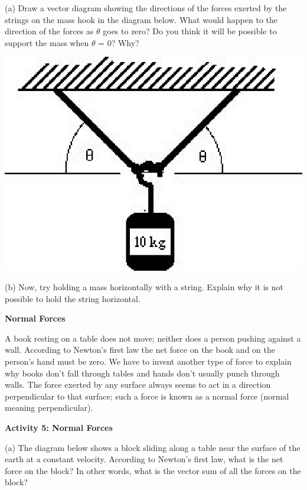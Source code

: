 (a) Draw a vector diagram showing the directions of the forces exerted by the
strings on the mass hook in the diagram below. What would happen to the direction
of the forces as \( \theta  \) goes to zero? Do you think it will be possible
to support the mass when \( \theta  \) = 0? Why?

\vspace{0.3cm}
{\par\raggedright \includegraphics{newton/newton_fig8.eps} \par}
\vspace{0.3cm}

(b) Now, try holding a mass horizontally with a string. Explain why it is not possible to hold the string horizontal.
\answerspace{20mm}

\textbf{Normal Forces} 

A book resting on a table does not move; neither does a person pushing against
a wall. According to Newton's first law the net force on the book and on the
person's hand must be zero. We have to invent another type of force
to explain why books don't fall through tables and hands don't usually punch
through walls. The force exerted by any surface always seems to act in a direction perpendicular to that surface; such a force is known as a normal force (normal meaning perpendicular).

\textbf{Activity 5: Normal Forces }

(a) The diagram below shows a block sliding along a table near the surface of
the earth at a constant velocity. According to Newton's first law, what is the
net force on the block? In other words, what is the vector sum of all the forces on the block?

